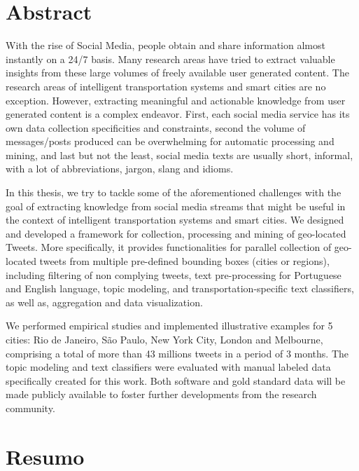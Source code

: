 \chapter*{Abstract}

With the rise of Social Media, people obtain and share information almost instantly on a 24/7 basis. Many research areas have tried to extract valuable insights from these large volumes of freely available user generated content. The research areas of intelligent transportation systems and smart cities are no exception. However, extracting meaningful and actionable knowledge from user generated content is a complex endeavor. First, each social media service has its own data collection specificities and constraints, second the volume of messages/posts produced can be overwhelming for automatic processing and mining, and last but not the least, social media texts are usually short, informal, with a lot of abbreviations, jargon, slang and idioms.
 
In this thesis, we try to tackle some of the aforementioned challenges with the goal of extracting knowledge from social media streams that might be useful in the context of intelligent transportation systems and smart cities. We designed and developed a framework for collection, processing and mining of geo-located Tweets. More specifically, it provides functionalities for parallel collection of geo-located tweets from multiple pre-defined bounding boxes (cities or regions), including filtering of non complying tweets, text pre-processing for Portuguese and English language, topic modeling, and transportation-specific text classifiers, as well as, aggregation and data visualization.
 
We performed empirical studies and implemented illustrative examples for 5 cities: Rio de Janeiro, São Paulo, New York City, London and Melbourne, comprising a total of more than 43 millions tweets in a period of 3 months. The topic modeling and text classifiers were evaluated with manual labeled data specifically created for this work. Both software and gold standard data will be made publicly available to foster further developments from the research community.


\chapter*{Resumo}

